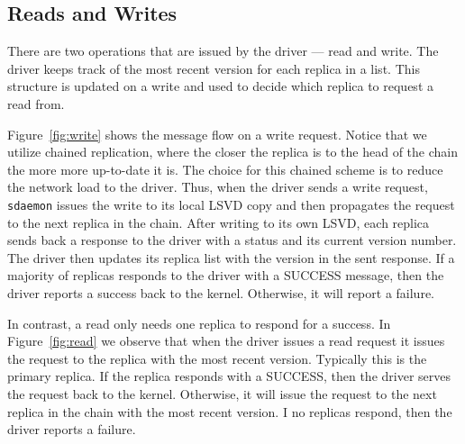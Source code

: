 \subsection{Reads and Writes}
\label{sec:readwrite}
There are two operations that are issued by the driver --- read and write.
The driver keeps track of the most recent version for each replica in a list.
This structure is updated on a write and used to decide which replica to 
request a read from.

Figure~\ref{fig:write} shows the message flow on a write request. Notice
that we utilize chained replication, where the closer the replica is to the 
head of the chain the more more up-to-date it is. The choice for this chained
scheme is to reduce the network load to the driver. Thus, when 
the driver sends a write request, \texttt{sdaemon} issues the write to its 
local LSVD copy and then propagates the request to the next replica in the 
chain. After writing to its own LSVD, each replica sends back a response to
the driver with a status and its current version number. The driver then 
updates its replica list with the version in the sent response. If a majority
of replicas responds to the driver with a SUCCESS message, then the driver 
reports a success back to the kernel. Otherwise, it will report a failure. 

In contrast, a read only needs one replica to respond for a success. In 
Figure~\ref{fig:read} we observe that when the driver issues a read request 
it issues the request to the replica with the most recent version. Typically 
this is the primary replica. If the replica responds with a SUCCESS, then 
the driver serves the request back to the kernel. Otherwise, it will issue 
the request to the next replica in the chain with the most recent version. I 
no replicas respond, then the driver reports a failure.

